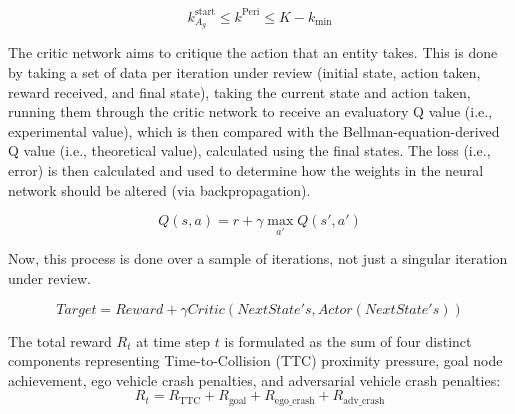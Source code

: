 \documentclass[12pt, a4paper]{report}
\begin{document}
\begin{equation}
    k^{\mathrm{start}}_{A_g} \le k^{\mathrm{Peri}} \le K - k_{\mathrm{min}} 
\end{equation}

The critic network aims to critique the action that an entity takes. This is done by taking a set of data per iteration under review (initial state, action taken, reward received, and final state), taking the current state and action taken, running them through the critic network to receive an evaluatory Q value (i.e., experimental value), which is then compared with the Bellman-equation-derived Q value (i.e., theoretical value), calculated using the final states. The loss (i.e., error) is then calculated and used to determine how the weights in the neural network should be altered (via backpropagation).


\begin{equation}
    Q(s,a)=r+\gamma \max\limits_{a'}Q(s',a')
\end{equation}

Now, this process is done over a sample of iterations, not just a singular iteration under review.

\begin{equation}
    Target = Reward + \gamma Critic(Next State 's, Actor(Next State 's))
\end{equation}


The total reward $R_t$ at time step $t$ is formulated as the sum of four distinct components representing Time-to-Collision (TTC) proximity pressure, goal node achievement, ego vehicle crash penalties, and adversarial vehicle crash penalties:
\begin{equation}
    R_t = R_{\text{TTC}} + R_{\text{goal}} + R_{\text{ego\_crash}} + R_{\text{adv\_crash}}
\end{equation}




\end{document}

